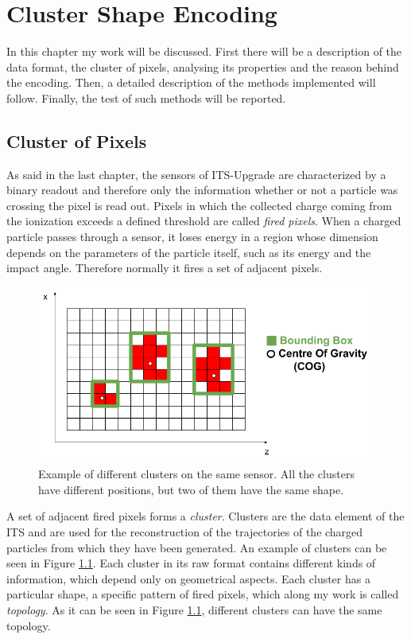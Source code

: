 \chapter{Cluster Shape Encoding}
In this chapter my work will be discussed. First there will be a description of the data format, the cluster of pixels, analysing its properties and the reason behind the encoding. Then, a detailed description of the methods implemented will follow. Finally, the test of such methods will be reported.
\section{Cluster of Pixels}
\label{sec:cluster}
As said in the last chapter, the sensors of ITS-Upgrade are characterized by a binary readout and therefore only the information whether or not a particle was crossing the pixel is read out. Pixels in which the collected charge coming from the ionization exceeds a defined threshold are called \textit{fired pixels}. When a charged particle passes through a sensor, it loses energy in a region whose dimension depends on the parameters of the particle itself, such as its energy and the impact angle. Therefore normally it fires a set of adjacent pixels.\\
%
\begin{figure}
  \centering
  \includegraphics[scale=0.55]{figures/cluster.png}
  \caption{Example of different clusters on the same sensor. All the clusters have different positions, but two of them have the same shape.}
  \label{fig:clusters}
\end{figure}
%
A set of adjacent fired pixels forms a \textit{cluster}. Clusters are the data element of the ITS and are used for the reconstruction of the trajectories of the charged particles from which they have been generated. An example of clusters can be seen in Figure \ref{fig:clusters}. Each cluster in its raw format contains different kinds of information, which depend only on geometrical aspects. Each cluster has a particular shape, a specific pattern of fired pixels, which along my work is called \textit{topology}. As it can be seen in Figure \ref{fig:clusters}, different clusters can have the same topology.\\
